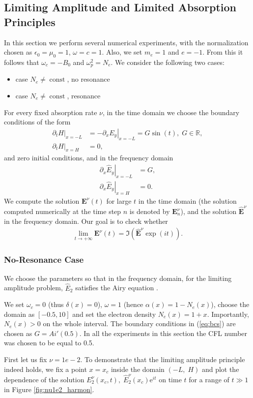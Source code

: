\subsection{Limiting Amplitude and Limited Absorption Principles}
In this section we perform several numerical experiments,
with the normalization chosen as $\epsilon_0=\mu_0=1$, $\omega=c=1$. 
Also, we set $m_e=1$ and $e=-1$. From this it follows that $\omega_c=-B_0$ and $\omega_p^2=N_e$. 
We consider the following two cases:
\begin{itemize}
 \item case $N_e\neq \operatorname{const}$, no resonance
 \item case $N_e\neq \operatorname{const}$, resonance
\end{itemize}
For every fixed absorption rate $\nu$, in the time domain we choose the boundary conditions of the form
\begin{align}
\label{eq:bcs}
\left.\partial_t H\right|_{x=-L}&=-\left.\partial_x E_y\right|_{x=-L}=G\sin(t),\; G\in \mathbb{R}, \\
 \nonumber
 \left.\partial_t H\right|_{x=H}&=0,
\end{align}
and zero initial conditions, and in the frequency domain
\begin{align*}
 \left.\partial_x \hat{E}_y\right|_{x=-L}&=G,\\
 \left.\partial_x \hat{E}_y\right|_{x=H}&=0.
\end{align*}
We compute the solution $\mathbf{E}^{\nu}(t)$ for large $t$ in the time domain (the solution computed numerically at the time step $n$ is denoted by $\mathbf{E}^{\nu}_{n}$), and the solution $\hat{\mathbf{E}}^{\nu}$ in the frequency domain. 
Our goal is to check whether
\begin{align*}
\lim_{t\rightarrow+\infty}\mathbf{E}^{\nu}(t)=\Im\left(\hat{\mathbf{E}}^{\nu}\exp(it)\right).
\end{align*}
\subsubsection{No-Resonance Case}
We choose the parameters so that in the frequency domain, for the limiting amplitude problem, $\hat{E}_{2}$ satisfies 
the Airy equation \cite{}. 

We set $\omega_c=0$ (thus $\delta(x)=0$), $\omega=1$ (hence $\alpha(x)=1-N_e(x)$), 
choose the domain as $[-0.5, 10]$ and set the electron density $N_e(x)=1+x$. Importantly, $N_e(x)>0$ on the whole interval.
The boundary conditions in (\ref{eq:bcs}) are chosen as $G=Ai'(0.5)$. 
In all the experiments in this section the CFL number was chosen to be equal to 0.5.


First let us fix $\nu=1e-2$. 
To demonstrate that the limiting amplitude principle indeed holds, we fix a point $x=x_c$ 
inside the domain $(-L,\; H)$ and plot the dependence of the solution $E_{2}^{\nu}(x_c,t), \; \hat{E}_2^{\nu}(x_c)\mathrm{e}^{it}$ 
on time $t$ for a range of $t\gg 1$ in Figure \ref{fig:nu1e2_harmon}.  